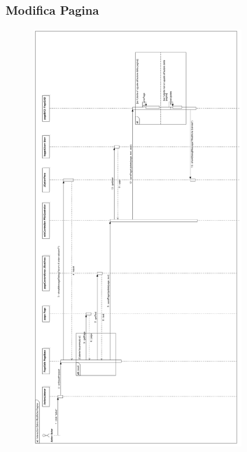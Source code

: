 \documentclass{article}
\begin{document}
	\subsubsection{Modifica Pagina}
	\begin{figure}[htbp]
		\centering
		\includegraphics[width=0.7\textwidth,height=0.7\textheight,keepaspectratio]{sequence_edit.png}
		\label{fig:10}
	\end{figure}
	
\end{document}
